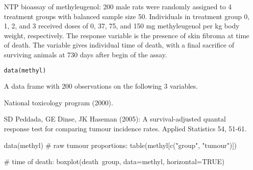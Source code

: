 \begin{Description}\relax
NTP bioassay of methyleugenol: 200 male rats were randomly assigned to 4 treatment groups with balanced sample size 50.
Individuals in treatment group 0, 1, 2, and 3 received doses of 0, 37, 75, and 150 mg methyleugenol per kg body weight, respectively.
The response variable  is the presence of skin fibroma at time of death.
The variable  gives individual time of death, with a final sacrifice of surviving animals at 730 days after begin of the assay.
\end{Description}
\begin{Usage}
\begin{verbatim}data(methyl)\end{verbatim}
\end{Usage}
\begin{Format}\relax
A data frame with 200 observations on the following 3 variables.
\end{Format}
\begin{Source}\relax
National toxicology program (2000).
\end{Source}
\begin{References}\relax
SD Peddada, GE Dinse, JK Haseman (2005): A survival-adjusted quantal response test for comparing tumour incidence rates. Applied Statistics 54, 51-61.
\end{References}
\begin{Examples}
\begin{ExampleCode}
data(methyl)
# raw tumour proportions:
table(methyl[c("group", "tumour")])

# time of death:
boxplot(death~group, data=methyl, horizontal=TRUE)

\end{ExampleCode}
\end{Examples}

